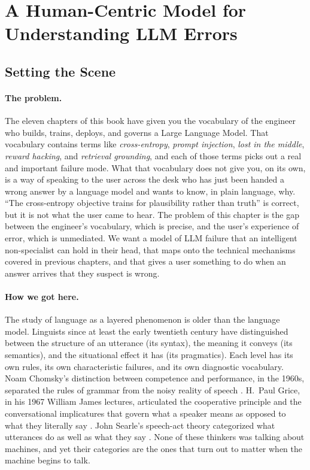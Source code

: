 \section{A Human-Centric Model for Understanding LLM Errors}
\label{sec:week12-error-model}

\subsection*{Setting the Scene}

\paragraph{The problem.}
The eleven chapters of this book have given you the vocabulary of
the engineer who builds, trains, deploys, and governs a Large
Language Model. That vocabulary contains terms like
\emph{cross-entropy}, \emph{prompt injection}, \emph{lost in the
middle}, \emph{reward hacking}, and \emph{retrieval grounding}, and
each of those terms picks out a real and important failure mode.
What that vocabulary does not give you, on its own, is a way of
speaking to the user across the desk who has just been handed a
wrong answer by a language model and wants to know, in plain
language, why. ``The cross-entropy objective trains for plausibility
rather than truth'' is correct, but it is not what the user came to
hear. The problem of this chapter is the gap between the engineer's
vocabulary, which is precise, and the user's experience of error,
which is unmediated. We want a model of LLM failure that an
intelligent non-specialist can hold in their head, that maps onto
the technical mechanisms covered in previous chapters, and that
gives a user something to do when an answer arrives that they
suspect is wrong.

\paragraph{How we got here.}
The study of language as a layered phenomenon is older than the
language model. Linguists since at least the early twentieth
century have distinguished between the structure of an utterance
(its syntax), the meaning it conveys (its semantics), and the
situational effect it has (its pragmatics). Each level has its own
rules, its own characteristic failures, and its own diagnostic
vocabulary. Noam Chomsky's distinction between competence and
performance, in the 1960s, separated the rules of grammar from the
noisy reality of speech \citep{chomsky1965aspects}. H.~Paul Grice,
in his 1967 William James lectures, articulated the cooperative
principle and the conversational implicatures that govern what a
speaker means as opposed to what they literally say
\citep{grice1975logic}. John Searle's speech-act theory categorized
what utterances do as well as what they say
\citep{searle1969speech}. None of these thinkers was talking about
machines, and yet their categories are the ones that turn out to
matter when the machine begins to talk.

